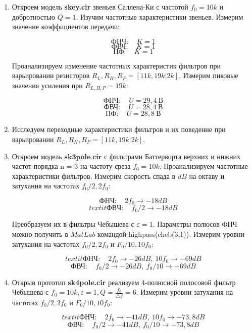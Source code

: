 \documentclass[a4paper, 12pt]{article}%
\begin{document}
\begin{enumerate}

\item Откроем модель \textbf{skey.cir} звеньев Саллена-Ки с частотой $f_0 = 10k$ и добротностью $Q = 1$. Изучим частотные характеристики звеньев. Измерим значение коэффициентов передачи:

\[\textit{ФНЧ}: \quad K = 1\]
\[\textit{ФВЧ}: \quad K = 1\]
\[\textit{ПФ}: \quad K = 1\]

Проанализируем изменение частотных характеристик фильтров при варьировании резисторов $R_L, R_H, R_P = [11k, 19k|2k].$ %
 Измерим пиковые значения усиления при $R_{L,H,P} = 19k$:

\[\textit{ФНЧ}: \quad U = 29,4 \: \text{В}\]
\[\textit{ФВЧ}: \quad U = 28,4 \: \text{В}\]
\[\textit{ПФ}: \quad U = 28,8 \: \text{В}\]

\item Исследуем переходные характеристики фильтров и их поведение при варьировании $R_L, R_H, R_P = [11k, 19k|2k].$ %

\item Откроем модель $\textbf{sk3pole.cir}$ с фильтрами Баттерворта верхних и нижних частот порядка n = 3 на частоту среза $f_0 = 10k$. Проанализируем частотные характеристики фильтров. Измерим скорость спада в $dB$ на октаву и затухания на частотах $f_0 / 2, 2f_0$:

\[\textit{ФНЧ}: \quad 2f_0 \rightarrow -18 dB\]
\[textit{ФВЧ}: \quad f_0 / 2 \rightarrow -18 dB\]

Преобразуем их в фильтры Чебышева с $\varepsilon = 1$. Параметры полюсов ФНЧ можно получить в $MatLab$ командой highpass(cheb(3,1)). Измерим уровни затухания на частотах $f_0 / 2, 2f_0$ и $F_0 / 10, 10f_0$:

\[textit{ФНЧ}: \quad 2f_0 \rightarrow -26 dB, \: 10f_0 \rightarrow -69 dB\]
\[\textit{ФВЧ}: \quad f_0 / 2 \rightarrow -26 dB, \: f_0 / 10 \rightarrow -69 dB\]

\item Открыв прототип \textbf{sk4pole.cir} реализуем 4-полюсной полосовой фильтр Чебышева с $f_0 = 10k, \varepsilon = 1, Q = \frac{f_0}{\bigtriangleup f} = 6$. Измерим уровни затухания на частотах $f_0 / 2, 2f_0$ и $F_0 / 10, 10f_0$:

\[textit{ФНЧ}: \quad 2f_0 \rightarrow -41 dB, \: 10f_0 \rightarrow -73,8 dB\]
\[\textit{ФВЧ}: \quad f_0 / 2 \rightarrow -41 dB, \: f_0 / 10 \rightarrow -73,8 dB\]

\end{enumerate}
\end{document}

